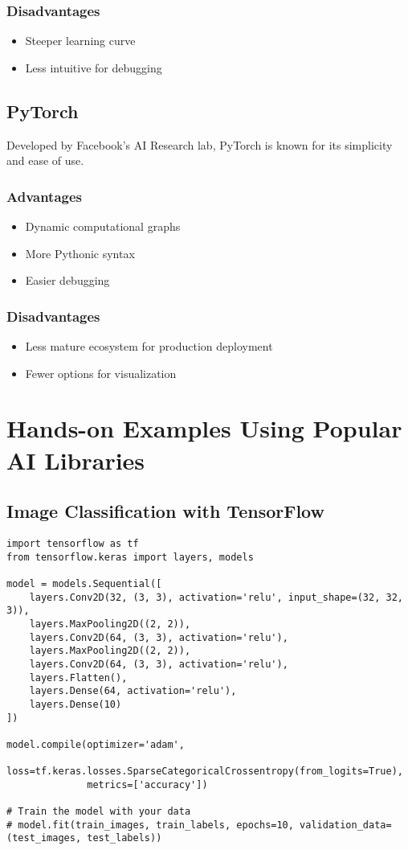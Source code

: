 \documentclass[
]{article}
\begin{document}
\subsubsection{Disadvantages}
\begin{itemize}
    \item Steeper learning curve
    \item Less intuitive for debugging
\end{itemize}

\subsection{PyTorch}

Developed by Facebook's AI Research lab, PyTorch is known for its
simplicity and ease of use.

\subsubsection{Advantages}
\begin{itemize}
    \item Dynamic computational graphs
    \item More Pythonic syntax
    \item Easier debugging
\end{itemize}

\subsubsection{Disadvantages}
\begin{itemize}
    \item Less mature ecosystem for production deployment
    \item Fewer options for visualization
\end{itemize}

\section{Hands-on Examples Using Popular AI Libraries}

\subsection{Image Classification with TensorFlow}
\begin{verbatim}
import tensorflow as tf
from tensorflow.keras import layers, models

model = models.Sequential([
    layers.Conv2D(32, (3, 3), activation='relu', input_shape=(32, 32, 3)),
    layers.MaxPooling2D((2, 2)),
    layers.Conv2D(64, (3, 3), activation='relu'),
    layers.MaxPooling2D((2, 2)),
    layers.Conv2D(64, (3, 3), activation='relu'),
    layers.Flatten(),
    layers.Dense(64, activation='relu'),
    layers.Dense(10)
])

model.compile(optimizer='adam',
              loss=tf.keras.losses.SparseCategoricalCrossentropy(from_logits=True),
              metrics=['accuracy'])

# Train the model with your data
# model.fit(train_images, train_labels, epochs=10, validation_data=(test_images, test_labels))
\end{verbatim}
\end{document}
